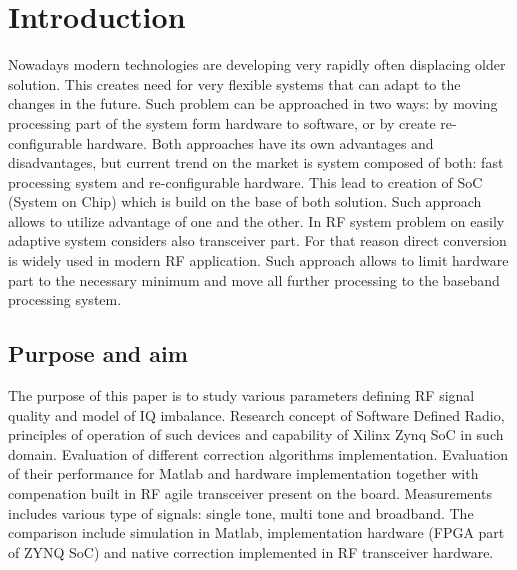 \documentclass[en,printmode]{mgr}
\begin{document}
\chapter{Introduction}
	Nowadays modern technologies are developing very rapidly often displacing older solution. This creates need
	for very flexible systems that can adapt to the changes in the future. Such problem can be approached in
	two ways: by moving processing part of the system form hardware to software, or by create re-configurable
	hardware. Both approaches have its own advantages and disadvantages, but current trend on the market is
	system composed of both: fast processing system and re-configurable hardware. This lead to creation of SoC
	(System on Chip) which is build on the base of both solution. Such approach allows to utilize advantage of
	one and the other. In RF system problem on easily adaptive system considers also transceiver part. For that
	reason direct conversion is widely used in modern RF application. Such approach allows to limit hardware part
	to the necessary minimum and move all further processing to the baseband processing system. 
	
	\section{Purpose and aim}
			The purpose of this paper is to study various parameters defining RF signal quality and model of IQ
		imbalance. Research concept of Software Defined Radio, principles of operation of such devices and capability
		of Xilinx Zynq SoC in such domain. Evaluation of different correction algorithms implementation. Evaluation
		of their performance for Matlab and hardware implementation together with compenation built in RF agile
		transceiver present on the board. Measurements includes various type of signals: single tone, multi tone 
		and broadband.
		The comparison include simulation in Matlab, implementation hardware (FPGA part of ZYNQ SoC) and
		native correction implemented in RF transceiver hardware.
		
\end{document}
